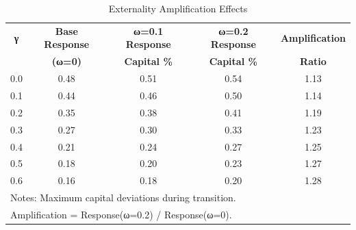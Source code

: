 \begin{table}[htbp]
\centering
\caption{Externality Amplification Effects}
\label{tab:externality_amplification}
\begin{tabular}{ccccc}
\hline
\textbf{γ} & \textbf{Base Response} & \textbf{ω=0.1 Response} & \textbf{ω=0.2 Response} & \textbf{Amplification} \\
 & \textbf{(ω=0)} & \textbf{Capital \%} & \textbf{Capital \%} & \textbf{Ratio} \\
\hline
0.0 & 0.48 & 0.51 & 0.54 & 1.13 \\
0.1 & 0.44 & 0.46 & 0.50 & 1.14 \\
0.2 & 0.35 & 0.38 & 0.41 & 1.19 \\
0.3 & 0.27 & 0.30 & 0.33 & 1.23 \\
0.4 & 0.21 & 0.24 & 0.27 & 1.25 \\
0.5 & 0.18 & 0.20 & 0.23 & 1.27 \\
0.6 & 0.16 & 0.18 & 0.20 & 1.28 \\
\hline
\multicolumn{5}{l}{\footnotesize Notes: Maximum capital deviations during transition.} \\
\multicolumn{5}{l}{\footnotesize Amplification = Response(ω=0.2) / Response(ω=0).} \\
\end{tabular}
\end{table}
